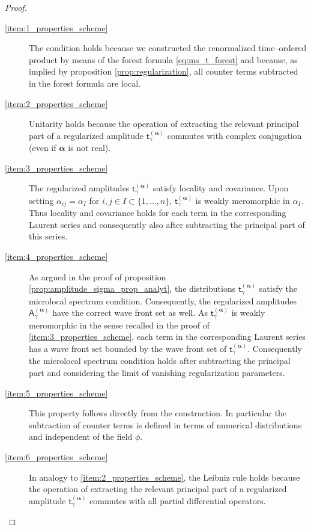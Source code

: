 \documentclass[11pt]{book}
\newcommand{\hilight}[1]{\colorbox{yellow!80!black}{#1}}
\newcommand{\alphabd}{\boldsymbol{\alpha}}
\newcommand{\Asf}{\mathsf{A}}
\newcommand{\tsf}{\mathsf{t}}
\theoremstyle{break}
\begin{document}
\begin{proof}
\begin{description}
\item[\ref{item:1_properties_scheme}] The condition holds because we constructed the renormalized time--ordered product by means of the forest formula \eqref{eq:ms_t_forest} and because, as implied by proposition \ref{prop:regularization}, all counter terms subtracted in the forest formula are local.
%
%
%
%
\item[\ref{item:2_properties_scheme}] Unitarity holds because the operation of extracting the relevant principal part of a regularized amplitude $\tsf^{(\alphabd)}_\gamma$ commutes with complex conjugation (even if $\alphabd$ is not real).
%
%
%
%
\item[\ref{item:3_properties_scheme}] The regularized amplitudes $\tsf^{(\alphabd)}_\gamma$ satisfy locality and covariance. Upon setting $\alpha_{ij}=\alpha_I$ for $i,j\in I\subset \{1,\dots,n\}$, $\tsf^{(\alphabd)}_\gamma$ is weakly meromorphic in $\alpha_I$. Thus locality and covariance holds for each term in the corresponding Laurent series and consequently also after subtracting the principal part of this series.
%
%
%
%
\item[\ref{item:4_properties_scheme}] As argued in the proof of proposition \ref{prop:amplitude_sigma_prop_analyt}, the distributions $\tsf^{(\alphabd)}_\gamma$ satisfy the microlocal spectrum condition. Consequently, the regularized amplitudes $\Asf^{(\alphabd)}_\gamma$ have the correct wave front set as well. As $\tsf^{(\alphabd)}_\gamma$ is weakly meromorphic in the sense recalled in the proof of \ref{item:3_properties_scheme}, each term in the corresponding Laurent series has a wave front set bounded by the wave front set of $\tsf^{(\alphabd)}_\gamma$. Consequently the microlocal spectrum condition holds after subtracting the principal part and considering the limit of vanishing regularization parameters.
%
%
%
%
\item[\ref{item:5_properties_scheme}] This property follows directly from the construction. In particular the subtraction of counter terms is defined in terms of numerical distributions and independent of the field $\phi$.
%
%
%
%
\item[\hilight{\ref{item:6_properties_scheme}}] In analogy to \ref{item:2_properties_scheme}, the Leibniz rule holds because the operation of extracting the relevant principal part of a regularized amplitude $\tsf^{(\alphabd)}_\gamma$ commutes with all partial differential operators.
%
%
%
%

\end{description}
\end{proof}
\end{document}
